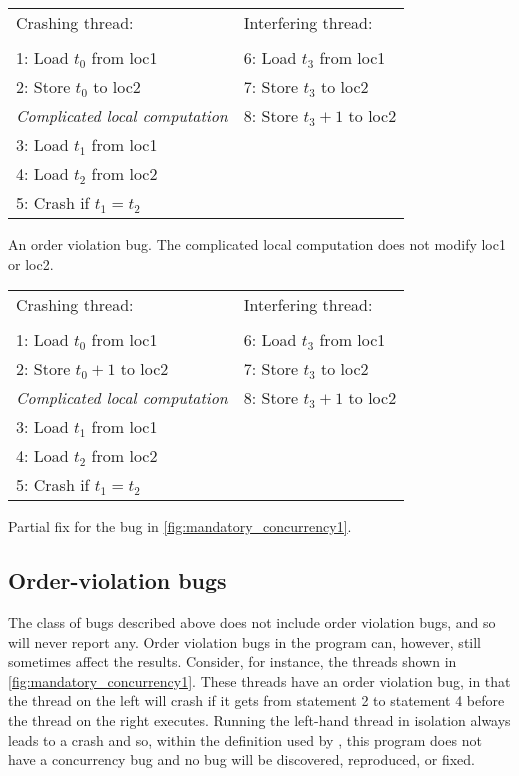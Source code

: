 \begin{sanefig}
{\hfill}
\begin{tabular}{p{8cm}l}
Crashing thread:\hfill         & Interfering thread: \\
\\
1: Load $t_0$ from loc1        & 6: Load $t_3$ from loc1 \\
2: Store $t_0$ to loc2         & 7: Store $t_3$ to loc2 \\
\textit{Complicated local computation} & 8: Store $t_3 + 1$ to loc2 \\
3: Load $t_1$ from loc1        & \\
4: Load $t_2$ from loc2        & \\
5: Crash if $t_1 = t_2$ & \\
\end{tabular}
{\hfill}
\caption{An order violation bug. The complicated local computation
  does not modify loc1 or loc2.}
\label{fig:mandatory_concurrency1}
\end{sanefig}

\begin{sanefig}
\begin{centering}
\hfill
\begin{tabular}{p{8cm}l}
Crashing thread:          & Interfering thread: \\
\\
1: Load $t_0$ from loc1        & 6: Load $t_3$ from loc1 \\
2: Store $t_0+1$ to loc2       & 7: Store $t_3$ to loc2 \\
\textit{Complicated local computation} & 8: Store $t_3 + 1$ to loc2 \\
3: Load $t_1$ from loc1        & \\
4: Load $t_2$ from loc2        & \\
5: Crash if $t_1 = t_2$ & \\
\end{tabular}
\hfill
\end{centering}
\caption{Partial fix for the bug in
  \autoref{fig:mandatory_concurrency1}.}
\label{fig:mandatory_concurrency2}
\end{sanefig}

\subsection{Order-violation bugs}
The class of bugs described above does not include order violation
bugs, and so {\technique} will never report any.  Order violation bugs
in the program can, however, still sometimes affect the results.
Consider, for instance, the threads shown in
\autoref{fig:mandatory_concurrency1}.  These threads have an order
violation bug, in that the thread on the left will crash if it gets
from statement 2 to statement 4 before the thread on the right
executes.  Running the left-hand thread in isolation always leads to a
crash and so, within the definition used by {\technique}, this program
does not have a concurrency bug and no bug will be discovered,
reproduced, or fixed.

